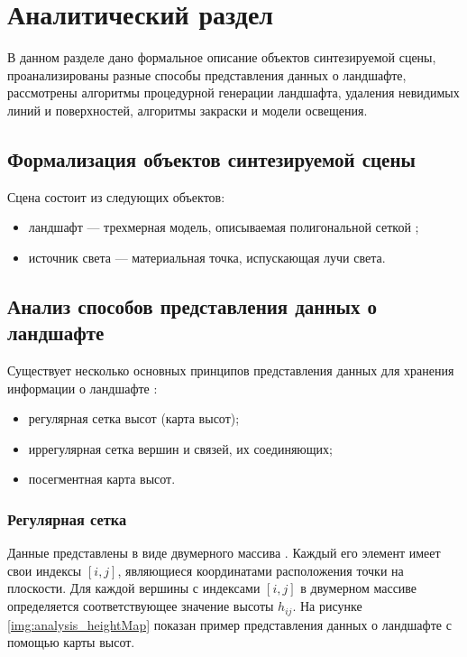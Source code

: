 \chapter{Аналитический раздел}


В данном разделе дано формальное описание объектов синтезируемой сцены, проанализированы разные способы представления данных о ландшафте, рассмотрены алгоритмы процедурной генерации ландшафта, удаления невидимых линий и поверхностей, алгоритмы закраски и модели освещения.

\section{Формализация объектов синтезируемой сцены}

Сцена состоит из следующих объектов:

\begin{itemize}[label=--]
	\item ландшафт --- трехмерная модель, описываемая полигональной сеткой \cite{info_landscape};
	\item источник света --- материальная точка, испускающая лучи света.
\end{itemize}

\section{Анализ способов представления данных о ландшафте}

Существует несколько основных принципов представления данных для хранения информации о ландшафте \cite{info_dataLandscapePresent}:

\begin{itemize}[label=--]
	\item регулярная сетка высот (карта высот);
	\item иррегулярная сетка вершин и связей, их соединяющих;
	\item посегментная карта высот.
\end{itemize}

\subsection{Регулярная сетка}

Данные представлены в виде двумерного массива \cite{info_heightMap}. 
Каждый его элемент имеет свои индексы $[i, j]$, являющиеся координатами расположения точки на плоскости. 
Для каждой вершины с индексами $[i, j]$ в двумерном массиве определяется соответствующее значение высоты $h_{ij}$. 
На рисунке \ref{img:analysis_heightMap} показан пример представления данных о ландшафте с помощью карты высот.

